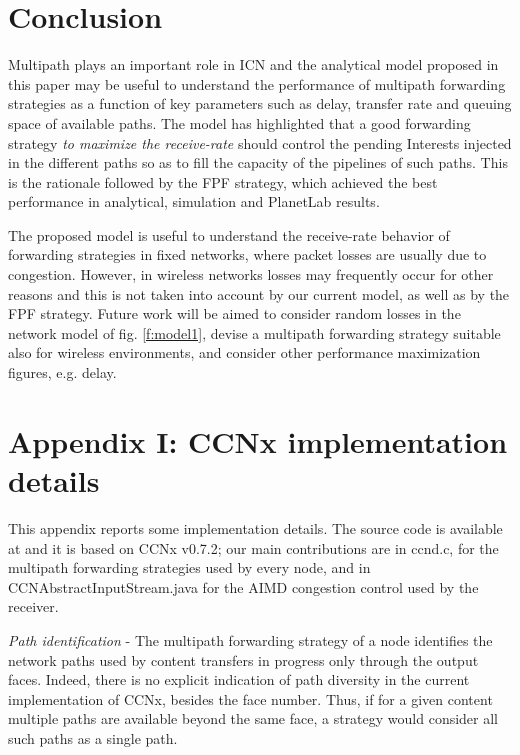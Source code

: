 \documentclass{sig-alternate-10pt}
\begin{document}
\section{Conclusion}
Multipath plays an important role in ICN and the analytical model proposed in this paper may be useful to understand the performance of multipath forwarding strategies as a function of key parameters such as delay, transfer rate and queuing space of available paths. The model has highlighted that a good forwarding strategy \textit{to maximize the receive-rate} should control the pending Interests injected in the different paths so as to fill the capacity of the pipelines of such paths. This is the rationale followed by the FPF strategy, which achieved the best performance in analytical, simulation and PlanetLab results.

The proposed model is useful to understand the receive-rate behavior of forwarding strategies in fixed networks, where packet losses are usually due to congestion. However, in wireless networks losses may frequently occur for other reasons and this is not taken into account by our current model, as well as by the FPF strategy. 
Future work will be aimed to consider random losses in the network model of fig. \ref{f:model1}, devise a multipath forwarding strategy suitable also for wireless environments, and consider other performance maximization figures, e.g. delay.






\section*{Appendix I: CCNx implementation details}

This appendix reports some implementation details. The source code is available at \cite{software} and it is based on CCNx v0.7.2; our main contributions are in ccnd.c, for the multipath forwarding strategies used by every node, and in CCNAbstractInputStream.java for the AIMD congestion control used by the receiver.

\emph{Path identification} -  The multipath forwarding strategy of a node identifies the network paths used by content transfers in progress only through the output faces. Indeed, there is no explicit indication of path diversity in the current implementation of CCNx, besides the face number. Thus, if for a given content multiple paths are available beyond the same face, a strategy would consider all such paths as a single path. 
\end{document}
